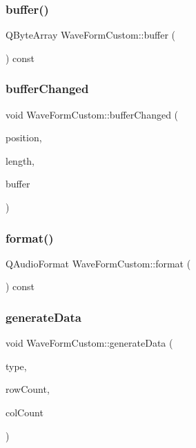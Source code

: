 \subsubsection{\texorpdfstring{buffer()}{buffer()}}
{\footnotesize\ttfamily Q\+Byte\+Array Wave\+Form\+Custom\+::buffer (\begin{DoxyParamCaption}{ }\end{DoxyParamCaption}) const}

\hypertarget{class_wave_form_custom_a78ba2270b3d08781fac5de6b39cb3a53}{}\label{class_wave_form_custom_a78ba2270b3d08781fac5de6b39cb3a53} 
\subsubsection{\texorpdfstring{buffer\+Changed}{bufferChanged}}
{\footnotesize\ttfamily void Wave\+Form\+Custom\+::buffer\+Changed (\begin{DoxyParamCaption}\item[{qint64}]{position,  }\item[{qint64}]{length,  }\item[{const Q\+Byte\+Array \&}]{buffer }\end{DoxyParamCaption})\hspace{0.3cm}{\ttfamily [slot]}}

\hypertarget{class_wave_form_custom_a4fc6efc93c4e13d29fb5cbabb8354cfb}{}\label{class_wave_form_custom_a4fc6efc93c4e13d29fb5cbabb8354cfb} 
\subsubsection{\texorpdfstring{format()}{format()}}
{\footnotesize\ttfamily Q\+Audio\+Format Wave\+Form\+Custom\+::format (\begin{DoxyParamCaption}{ }\end{DoxyParamCaption}) const}

\hypertarget{class_wave_form_custom_ab69bdeeb043d9304d19723e4b35c2f33}{}\label{class_wave_form_custom_ab69bdeeb043d9304d19723e4b35c2f33} 
\subsubsection{\texorpdfstring{generate\+Data}{generateData}}
{\footnotesize\ttfamily void Wave\+Form\+Custom\+::generate\+Data (\begin{DoxyParamCaption}\item[{int}]{type,  }\item[{int}]{row\+Count,  }\item[{int}]{col\+Count }\end{DoxyParamCaption})\hspace{0.3cm}{\ttfamily [slot]}}

